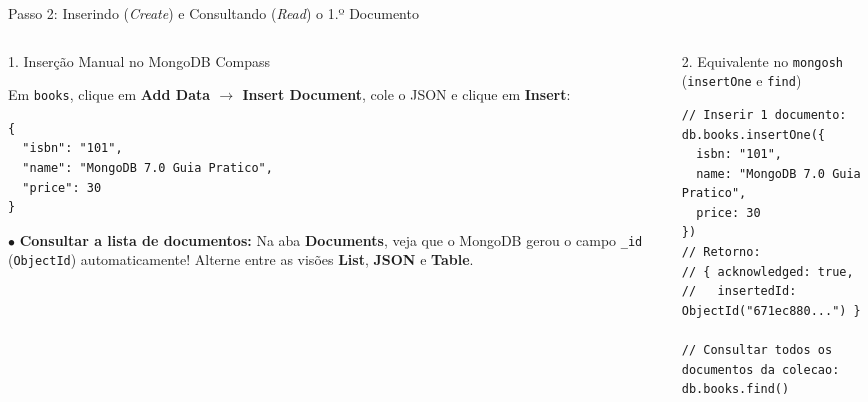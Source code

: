 \begin{frame}[fragile]{Passo 2: Inserindo (\textit{Create}) e Consultando (\textit{Read}) o 1.º Documento}
  \vspace{0.05cm}
  \begin{columns}[t]
    \begin{column}{0.48\textwidth}
      \alert{1. Inserção Manual no MongoDB Compass}\par
      \scriptsize
      Em \texttt{books}, clique em \textbf{Add Data $\to$ Insert Document}, cole o JSON e clique em \textbf{Insert}:
      \begin{lstlisting}[language=mongosh]
{
  "isbn": "101",
  "name": "MongoDB 7.0 Guia Pratico",
  "price": 30
}
      \end{lstlisting}
      \scriptsize
      $\bullet$ \textbf{Consultar a lista de documentos:} Na aba \textbf{Documents}, veja que o MongoDB gerou o campo \texttt{\_id} (\texttt{ObjectId}) automaticamente! Alterne entre as visões \textbf{List}, \textbf{JSON} e \textbf{Table}.
    \end{column}
    \begin{column}{0.48\textwidth}
      \alert{2. Equivalente no \texttt{mongosh} (\texttt{insertOne} e \texttt{find})}\par
      \begin{lstlisting}[language=mongosh]
// Inserir 1 documento:
db.books.insertOne({
  isbn: "101",
  name: "MongoDB 7.0 Guia Pratico",
  price: 30
})
// Retorno:
// { acknowledged: true,
//   insertedId: ObjectId("671ec880...") }

// Consultar todos os documentos da colecao:
db.books.find()
      \end{lstlisting}
    \end{column}
  \end{columns}
\end{frame}

